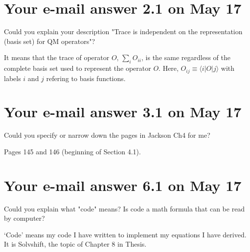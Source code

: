 \documentclass{exam}
\begin{document}
\section{Your e-mail answer 2.1 on May 17}
\begin{questions}

%
\question Could you explain your description "Trace is independent on the representation (basis set) for QM operators"?

\begin{solution}
It means that the trace of operator $O$, $\sum_i O_{ii}$, is the same regardless of the complete 
basis set used to 
represent the operator $O$. Here, $O_{ij} \equiv \langle i \vert O \vert j \rangle$ with 
labels $i$ and $j$ refering to basis functions.
\end{solution}
\end{questions}

\section{Your e-mail answer 3.1 on May 17}
\begin{questions}

%
\question Could you specify or narrow down the pages in Jackson Ch4 for me?

\begin{solution}
Pages 145 and 146 (beginning of Section 4.1).
\end{solution}
\end{questions}

\section{Your e-mail answer 6.1 on May 17}
\begin{questions}

%
\question Could you explain what "code" means? Is code a math formula that can be read by computer?

\begin{solution}
`Code' means my code I have written to implement my equations I have derived.
It is Solvshift, the topic of Chapter 8 in Thesis.
\end{solution}
\end{questions}
\end{document}

